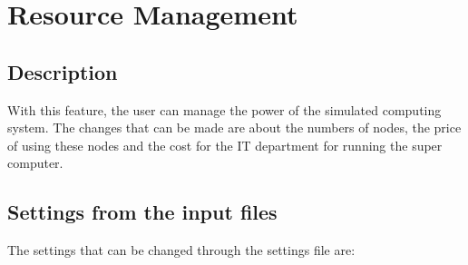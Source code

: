 \documentclass{scrreprt}
\begin{document}
\section{Resource Management}


\subsection{Description}
With this feature, the user can manage the power of the simulated computing system. The changes that can be made are about the numbers of nodes, the price of using these nodes and the cost for the IT department for running the super computer. 
\subsection{Settings from the input files}
The settings that can be changed through the settings file are:
\end{document}
